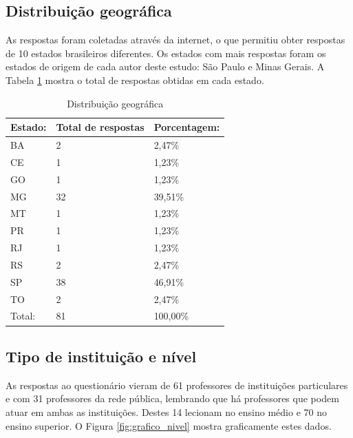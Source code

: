 \subsection{Distribuição geográfica}
As respostas foram coletadas através da internet, o que permitiu obter respostas de 10 estados brasileiros diferentes. Os estados com mais respostas foram os estados de origem de cada autor deste estudo: São Paulo e Minas Gerais.
A Tabela \ref{tab:distribuicao_geografica} mostra o total de respostas obtidas em cada estado.

\bgroup
\def\arraystretch{1.5} %
\begin{table}[h]{} %
\centering
\begin{tabular}{ | p{3cm} | p{5cm}| p{5cm}| } \hline
\textbf{Estado:} & \textbf{Total de respostas} & \textbf{Porcentagem: } \\ \hline
BA & 2 & 2,47\% \\ \hline
CE & 1 & 1,23\% \\ \hline
GO & 1 & 1,23\% \\ \hline
MG & 32 & 39,51\% \\ \hline
MT & 1 & 1,23\% \\ \hline
PR & 1 & 1,23\% \\ \hline
RJ & 1 & 1,23\% \\ \hline
RS & 2 & 2,47\% \\ \hline
SP & 38 & 46,91\% \\ \hline
TO & 2 & 2,47\% \\ \hline
Total: & 81 & 100,00\% \\ \hline
\end{tabular}
\caption{Distribuição geográfica}
\label{tab:distribuicao_geografica}
\end{table}
\egroup

\subsection{Tipo de instituição e nível}

As respostas ao questionário vieram de 61 professores de instituições particulares e com 31 professores da rede pública, lembrando que há professores que podem atuar em ambas as instituições. Destes 14 lecionam no ensino médio e 70 no ensino superior. O Figura \ref{fig:grafico_nivel} mostra graficamente estes dados.
 
